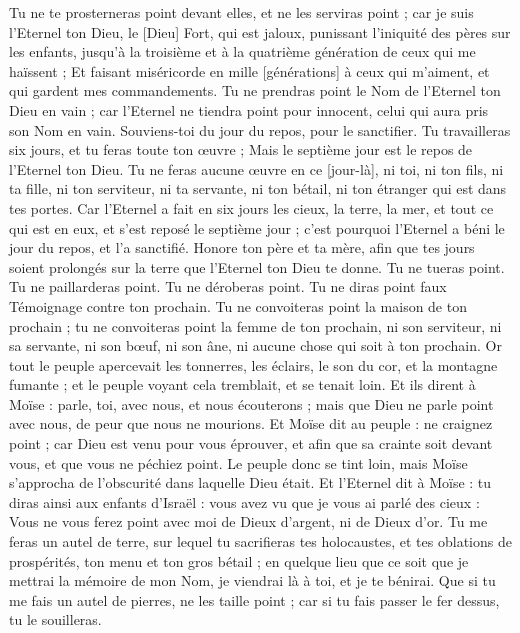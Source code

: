 \begin{multicols}{2}
Tu ne te prosterneras point devant elles, et ne les serviras point ; car je suis l'Eternel ton Dieu, le [Dieu] Fort, qui est jaloux, punissant l'iniquité des pères sur les enfants, jusqu'à la troisième et à la quatrième génération de ceux qui me haïssent ;
Et faisant miséricorde en mille [générations] à ceux qui m'aiment, et qui gardent mes commandements.
Tu ne prendras point le Nom de l'Eternel ton Dieu en vain ; car l'Eternel ne tiendra point pour innocent, celui qui aura pris son Nom en vain.
Souviens-toi du jour du repos, pour le sanctifier.
Tu travailleras six jours, et tu feras toute ton œuvre ;
Mais le septième jour est le repos de l'Eternel ton Dieu. Tu ne feras aucune œuvre en ce [jour-là], ni toi, ni ton fils, ni ta fille, ni ton serviteur, ni ta servante, ni ton bétail, ni ton étranger qui est dans tes portes.
Car l'Eternel a fait en six jours les cieux, la terre, la mer, et tout ce qui est en eux, et s'est reposé le septième jour ; c'est pourquoi l'Eternel a béni le jour du repos, et l'a sanctifié.
Honore ton père et ta mère, afin que tes jours soient prolongés sur la terre que l'Eternel ton Dieu te donne.
Tu ne tueras point.
Tu ne paillarderas point.
Tu ne déroberas point.
Tu ne diras point faux Témoignage contre ton prochain.
Tu ne convoiteras point la maison de ton prochain ; tu ne convoiteras point la femme de ton prochain, ni son serviteur, ni sa servante, ni son bœuf, ni son âne, ni aucune chose qui soit à ton prochain.
Or tout le peuple apercevait les tonnerres, les éclairs, le son du cor, et la montagne fumante ; et le peuple voyant cela tremblait, et se tenait loin.
Et ils dirent à Moïse : parle, toi, avec nous, et nous écouterons ; mais que Dieu ne parle point avec nous, de peur que nous ne mourions.
Et Moïse dit au peuple : ne craignez point ; car Dieu est venu pour vous éprouver, et afin que sa crainte soit devant vous, et que vous ne péchiez point.
Le peuple donc se tint loin, mais Moïse s'approcha de l'obscurité dans laquelle Dieu était.
Et l'Eternel dit à Moïse : tu diras ainsi aux enfants d'Israël : vous avez vu que je vous ai parlé des cieux :
Vous ne vous ferez point avec moi de Dieux d'argent, ni de Dieux d'or.
Tu me feras un autel de terre, sur lequel tu sacrifieras tes holocaustes, et tes oblations de prospérités, ton menu et ton gros bétail ; en quelque lieu que ce soit que je mettrai la mémoire de mon Nom, je viendrai là à toi, et je te bénirai.
Que si tu me fais un autel de pierres, ne les taille point ; car si tu fais passer le fer dessus, tu le souilleras.

\end{multicols}
